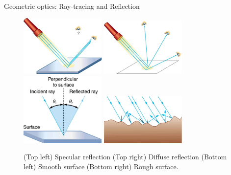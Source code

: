 \documentclass{beamer}
\begin{document}
\begin{frame}{Geometric optics: Ray-tracing and Reflection}
\begin{figure}
\includegraphics[width=0.375\textwidth]{figures/geo5.png}
\includegraphics[width=0.375\textwidth]{figures/geo3.png}
\includegraphics[width=0.375\textwidth]{figures/geo4.png}
\includegraphics[width=0.375\textwidth]{figures/geo1.png}
\caption{\label{fig:geo1} \footnotesize (Top left) Specular reflection (Top right) Diffuse reflection (Bottom left) Smooth surface (Bottom right) Rough surface.}
\end{figure}
\end{frame}
\end{document}
